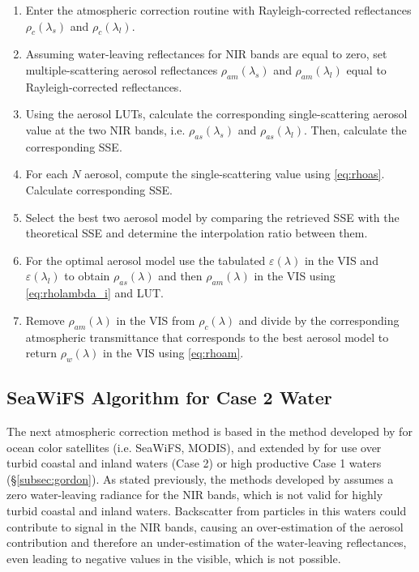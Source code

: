 \begin{enumerate}[itemsep=2pt,parsep=2pt]
  \item Enter the atmospheric correction routine with Rayleigh-corrected reflectances $\rho_c(\lambda_s)$ and $\rho_c(\lambda_l)$.
  \item Assuming water-leaving reflectances for NIR bands are equal to zero, set multiple-scattering aerosol reflectances $\rho_{am}(\lambda_s)$ and $\rho_{am}(\lambda_l)$ equal to Rayleigh-corrected reflectances.
  \item Using the aerosol LUTs, calculate the corresponding single-scattering aerosol value at the two NIR bands, i.e. $\rho_{as}(\lambda_s)$ and $\rho_{as}(\lambda_l)$. Then, calculate the corresponding SSE.
  \item For each $N$ aerosol, compute the single-scattering value using \autoref{eq:rhoas}. Calculate corresponding SSE.
  \item Select the best two aerosol model by comparing the retrieved SSE with the theoretical SSE and determine the interpolation ratio between them.
  \item For the optimal aerosol model use the tabulated $\varepsilon(\lambda)$ in the VIS and $\varepsilon(\lambda_l)$ to obtain $\rho_{as}(\lambda)$ and then $\rho_{am}(\lambda)$ in the VIS using \autoref{eq:rholambda_i} and LUT.
  \item Remove $\rho_{am}(\lambda)$ in the VIS from $\rho_c(\lambda)$ and divide by the corresponding atmospheric transmittance that corresponds to the best aerosol model to return $\rho_w(\lambda)$ in the VIS using \autoref{eq:rhoam}.
\end{enumerate}

\subsection{SeaWiFS Algorithm for Case 2 Water}\label{subsec:ruddick}

The next atmospheric correction method is based in the method developed by \cite{Gordon:1994} for ocean color satellites (i.e. SeaWiFS, MODIS), and extended by \cite{Ruddick:2000bs} for use over turbid coastal and inland waters (Case 2) or high productive Case 1 waters (\S\ref{subsec:gordon}). As stated previously, the methods developed by \cite{Gordon:1994} assumes a zero water-leaving radiance for the NIR bands, which is not valid for highly turbid coastal and inland waters. Backscatter from particles in this waters could contribute to signal in the NIR bands, causing an over-estimation of the aerosol contribution and therefore an under-estimation of the water-leaving reflectances, even leading to negative values in the visible, which is not possible. 

